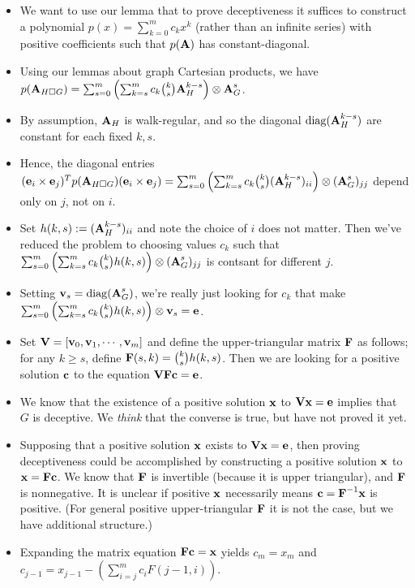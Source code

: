 \begin{itemize}
  \item We want to use our lemma that to prove deceptiveness it suffices to construct a polynomial $p(x) = \sum_{k=0}^m c_k x^k $  (rather than an infinite series) with positive coefficients such that $p(\textbf{A})$ has constant-diagonal.
  \item Using our lemmas about graph Cartesian products, we have $p( \textbf{A}_{H \Box G}) = \sum_{s=0}^m \left( \sum_{k=s}^m c_k \binom{k}{s} \textbf{A}_H^{k-s} \right)\otimes \textbf{A}_G^s$.
  \item By assumption, $\textbf{A}_H$ is walk-regular, and so the diagonal $\operatorname{diag}(\textbf{A}_H^{k-s})$ are constant for each fixed $k,s$.
  \item Hence, the diagonal entries $(\textbf{e}_i \times \textbf{e}_j)^T p(\textbf{A}_{H\Box G})(\textbf{e}_i \times \textbf{e}_j) = \sum_{s=0}^m \left( \sum_{k=s}^m c_k \binom{k}{s} (\textbf{A}_H^{k-s})_{ii} \right)\otimes (\textbf{A}_G^s)_{jj}$ depend only on $j$, not on $i$.
  \item Set $h(k,s) := (\textbf{A}_H^{k-s})_{ii}$ and note the choice of $i$ does not matter. Then we've reduced the problem to choosing values $c_k$ such that $ \sum_{s=0}^m \left( \sum_{k=s}^m c_k \binom{k}{s} h(k,s) \right)\otimes (\textbf{A}_G^s)_{jj}$ is contsant for different $j$.
  \item Setting $\textbf{v}_s = \operatorname{diag}( \textbf{A}_G^s )$, we're really just looking for $c_k$ that make $\sum_{s=0}^m \left( \sum_{k=s}^m c_k \binom{k}{s} h(k,s) \right)\otimes \textbf{v}_s = \textbf{e}$.
  \item Set $\textbf{V} = [ \textbf{v}_0, \textbf{v}_1, \cdots, \textbf{v}_m ]$ and define the upper-triangular matrix $\textbf{F}$ as follows; for any $k \geq s$, define $\textbf{F}(s,k) = \binom{k}{s} h(k,s)$. Then we are looking for a positive solution $\textbf{c}$ to the equation $\textbf{V}\textbf{F}\textbf{c} = \textbf{e}$.
  \item We know that the existence of a positive solution $\textbf{x}$ to $\textbf{V}\textbf{x} = \textbf{e}$ implies that $G$ is deceptive. We \emph{think} that the converse is true, but have not proved it yet.
  \item Supposing that a positive solution $\textbf{x}$ exists to $\textbf{V} \textbf{x} = \textbf{e}$, then proving deceptiveness could be accomplished by constructing a positive solution $\textbf{x}$ to $\textbf{x} = \textbf{F}\textbf{c}$. We know that $\textbf{F}$ is invertible (because it is upper triangular), and $\textbf{F}$ is nonnegative. It is unclear if positive $\textbf{x}$ necessarily means $\textbf{c} = \textbf{F}^{-1} \textbf{x}$ is positive. (For general positive upper-triangular $\textbf{F}$ it is not the case, but we have additional structure.)
  \item Expanding the matrix equation $\textbf{F}\textbf{c} = \textbf{x}$ yields $c_m = x_m$ and $c_{j-1} = x_{j-1} - (\sum_{i=j}^m c_i F(j-1,i))$.
\end{itemize}
